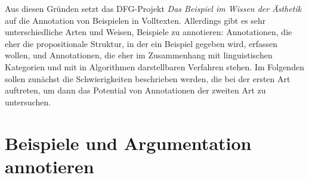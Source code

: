 \documentclass{article}
\begin{document}
Aus diesen Gründen setzt das DFG-Projekt \textit{Das Beispiel im
  Wissen der Ästhetik} auf die Annotation von Beispielen in
Volltexten. Allerdings gibt es sehr unterschiedliche Arten und Weisen,
Beispiele zu annotieren: Annotationen, die eher die propositionale
Struktur, in der ein Beispiel gegeben wird, erfassen wollen, und
Annotationen, die eher im Zusammenhang mit linguistischen Kategorien
und mit in Algorithmen darstellbaren Verfahren stehen. Im Folgenden
sollen zunächst die Schwierigkeiten beschrieben werden, die bei der
ersten Art auftreten, um dann das Potential von Annotationen der
zweiten Art zu untersuchen.

\section{Beispiele und Argumentation annotieren}
\end{document}
